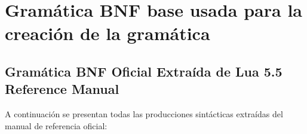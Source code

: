 \documentclass[10pt,letterpaper]{article}
\begin{document}
\section{Gramática BNF base usada para la creación de la gramática}

\subsection{Gramática BNF Oficial Extraída de Lua 5.5 Reference Manual}

A continuación se presentan todas las producciones sintácticas extraídas del manual de referencia oficial:
\end{document}
